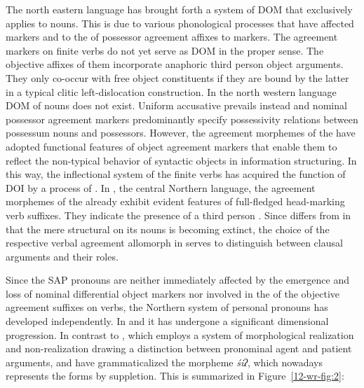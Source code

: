 \documentclass[output=paper]{LSP/langsci}
\begin{document}
The north eastern language  has brought forth a system of DOM that exclusively applies to nouns. 
This is due to various phonological processes that have affected  markers and to the  of possessor agreement affixes to  markers. 
The agreement markers on  finite verbs do not yet serve as DOM in the proper sense. 
The objective affixes of them incorporate anaphoric third person object arguments. They only co-occur with free object constituents if they are bound by the latter in a typical clitic left-dislocation construction. 
In the north western language  DOM of nouns does not exist. 
Uniform accusative  prevails instead and nominal possessor agreement markers predominantly specify possessivity relations between possessum nouns and possessors. 
However, the agreement morphemes of the   have adopted functional features of object agreement markers that enable them to reflect the non-typical behavior of syntactic objects in information structuring. 
In this way, the inflectional system of the  finite verbs has acquired the function of DOI by a process of . In , the central Northern  language, the agreement morphemes of the  already exhibit evident features of full-fledged head-marking verb suffixes. They indicate the presence of a  third person . Since  differs from  in that the mere structural  on its nouns is becoming extinct, the choice of the respective verbal agreement allomorph in  serves to distinguish between clausal arguments and their roles. 

Since the  SAP pronouns are neither immediately affected by the emergence and loss of nominal differential object markers nor involved in the  of the objective agreement suffixes on verbs, the Northern  system of personal pronouns has developed independently. In  and  it has undergone a significant dimensional progression. In contrast to , which employs a system of morphological realization and non-realization drawing a distinction between pronominal agent and patient arguments,  and  have grammaticalized the morpheme \textit{śiʔ}, which nowadays represents the  forms by suppletion. 
This is summarized in Figure~\ref{12-wr-fig:2}: 
\end{document}
